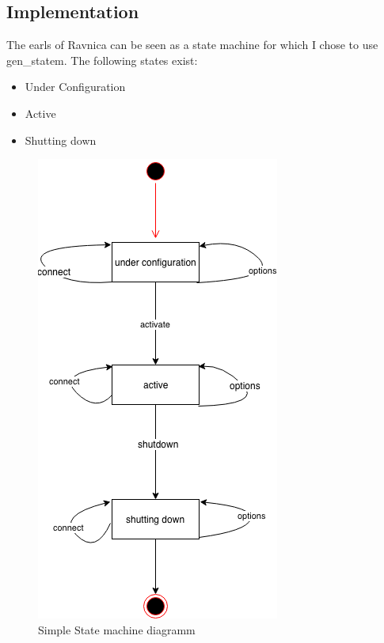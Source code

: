 \documentclass[12pt,a4paper]{article}
\begin{document}
\subsection{Implementation}
The earls of Ravnica can be seen as a state machine for which I chose to use gen\_statem.
The following states exist:
\begin{itemize}
	\item Under Configuration
	\item Active
	\item Shutting down
\end{itemize}

\begin{figure}[!htb]
	\includegraphics{images/ravnica}
	\caption{Simple State machine diagramm}
\end{figure}
\end{document}
